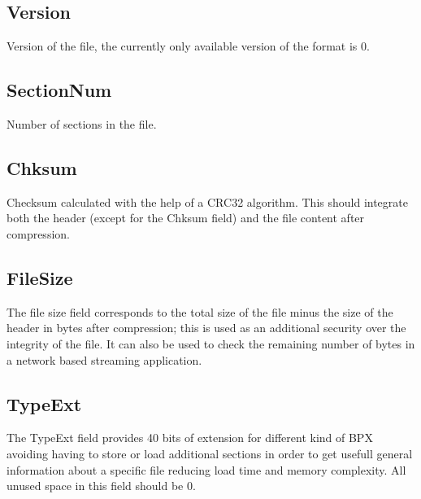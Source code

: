 \subsection{Version}
Version of the file, the currently only available version of the format is 0.

\subsection{SectionNum}
Number of sections in the file.

\subsection{Chksum}
Checksum calculated with the help of a CRC32 algorithm. This should integrate both the header (except for the Chksum field) and the file content after compression.

\subsection{FileSize}
The file size field corresponds to the total size of the file minus the size of the header in bytes after compression; this is used as an additional security over the integrity of the file. It can also be used to check the remaining number of bytes in a network based streaming application.

\subsection{TypeExt}
The TypeExt field provides 40 bits of extension for different kind of BPX avoiding having to store or load additional sections in order to get usefull general information about a specific file reducing load time and memory complexity.\newline
All unused space in this field should be 0.

